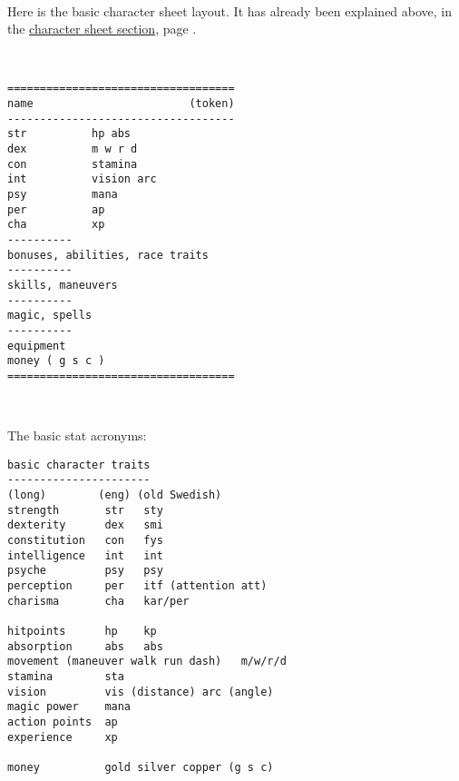 \

\raggedbottom %

\begin{samepage}
Here is the basic character sheet layout. It has already been explained above, in the \hyperref[sec:charsheet]{character sheet section}, page \pageref{sec:charsheet}.

\

\begin{verbatim}
===================================
name                        (token)
-----------------------------------
str          hp abs
dex          m w r d
con          stamina
int          vision arc
psy          mana
per          ap
cha          xp
----------
bonuses, abilities, race traits
----------
skills, maneuvers
----------
magic, spells
----------
equipment
money ( g s c )
===================================
\end{verbatim}
\end{samepage}

\

\begin{samepage}
\noindent The basic stat acronyms:
\begin{verbatim}
basic character traits
----------------------
(long)        (eng) (old Swedish)
strength       str   sty
dexterity      dex   smi
constitution   con   fys
intelligence   int   int
psyche         psy   psy
perception     per   itf (attention att)
charisma       cha   kar/per

hitpoints      hp    kp
absorption     abs   abs
movement (maneuver walk run dash)   m/w/r/d
stamina        sta
vision         vis (distance) arc (angle)
magic power    mana
action points  ap
experience     xp

money          gold silver copper (g s c)
\end{verbatim} \end{samepage}

\



\


